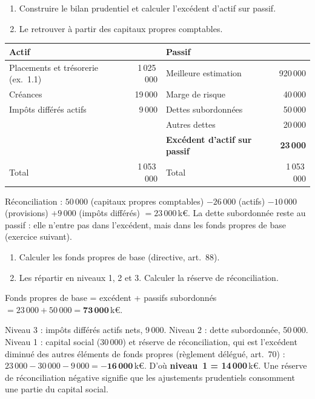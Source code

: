 \documentclass[11pt,a4paper]{article}
\newcommand{\keur}{\,k\euro}
\begin{document}
\begin{exercice}
\begin{enumerate}[nosep]
  \item Construire le bilan prudentiel et calculer l'excédent d'actif sur passif.
  \item Le retrouver à partir des capitaux propres comptables.
\end{enumerate}
\end{exercice}
\begin{corrige}
\begin{center}
\begin{tabular}{lr@{\qquad}lr}
\toprule
Actif & & Passif & \\
\midrule
Placements et trésorerie (ex.~1.1) & 1\,025\,000 & Meilleure estimation & 920\,000 \\
Créances                           &    19\,000 & Marge de risque      &  40\,000 \\
Impôts différés actifs             &     9\,000 & Dettes subordonnées  &  50\,000 \\
                                   &            & Autres dettes        &  20\,000 \\
                                   &            & \textbf{Excédent d'actif sur passif} & \textbf{23\,000} \\
\midrule
Total                              & 1\,053\,000 & Total & 1\,053\,000 \\
\bottomrule
\end{tabular}
\end{center}
Réconciliation : $50\,000$ (capitaux propres comptables) $- 26\,000$ (actifs) $- 10\,000$
(provisions) $+ 9\,000$ (impôts différés) $= 23\,000$\keur. La dette subordonnée reste au passif :
elle n'entre pas dans l'excédent, mais dans les fonds propres de base (exercice suivant).
\end{corrige}

\begin{exercice}
\begin{enumerate}[nosep]
  \item Calculer les fonds propres de base (directive, art.~88).
  \item Les répartir en niveaux 1, 2 et 3. Calculer la réserve de réconciliation.
\end{enumerate}
\end{exercice}
\begin{corrige}
Fonds propres de base = excédent + passifs subordonnés $= 23\,000 + 50\,000 = \mathbf{73\,000}$\keur.

\noindent Niveau 3 : impôts différés actifs nets, 9\,000. Niveau 2 : dette subordonnée, 50\,000.
Niveau 1 : capital social (30\,000) et réserve de réconciliation, qui est l'excédent diminué des
autres éléments de fonds propres (règlement délégué, art.~70) :
$23\,000 - 30\,000 - 9\,000 = \mathbf{-16\,000}$\keur. D'où
\textbf{niveau~1 = 14\,000}\keur. Une réserve de réconciliation négative signifie que les
ajustements prudentiels consomment une partie du capital social.
\end{corrige}
\end{document}
